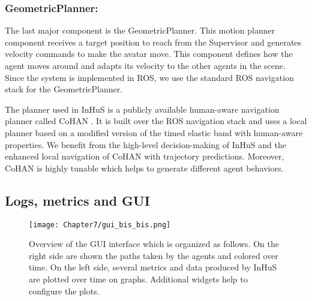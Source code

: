 \subsubsection{GeometricPlanner:}

The last major component is the GeometricPlanner. This motion planner component receives a target position to reach from the Supervisor and generates velocity commands to make the avatar move. This component defines how the agent moves around and adapts its velocity to the other agents in the scene. Since the system is implemented in ROS, we use the standard ROS navigation stack for the GeometricPlanner.

The planner used in InHuS is a publicly available human-aware navigation planner called CoHAN \cite{singamaneni2021human}. It is built over the ROS navigation stack and uses a local planner based on a modified version of the timed elastic band with human-aware properties. 
We benefit from the high-level decision-making of InHuS and the enhanced local navigation of CoHAN with trajectory predictions. Moreover, CoHAN is highly tunable which helps to generate different agent behaviors. 

\subsection{Logs, metrics and GUI} \label{sec:logs_metrics}

\begin{figure}[!b]
    \centering
    \texttt{[image: Chapter7/gui\_bis\_bis.png]}
    \caption{
    Overview of the GUI interface which is organized as follows. On the right side are shown the paths taken by the agents and colored over time. On the left side, several metrics and data produced by InHuS are plotted over time on graphs. Additional widgets help to configure the plots. 
    }
    \label{fig:gui}
\end{figure}

